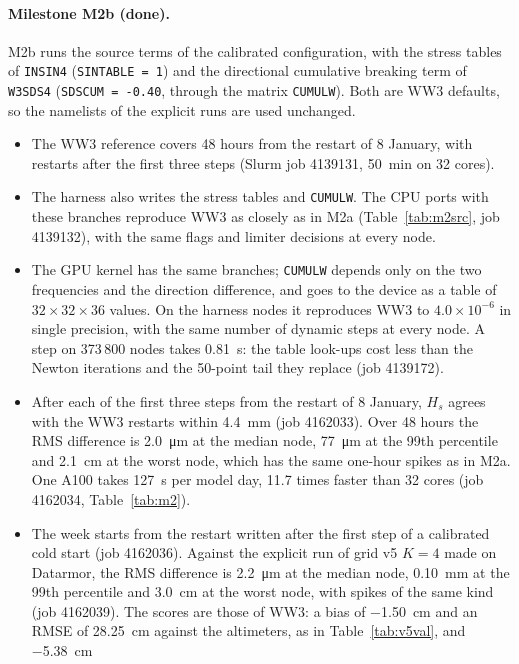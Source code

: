 \documentclass[11pt,a4paper]{article}
\begin{document}
\paragraph{Milestone M2b (done).} M2b runs the source terms of the
calibrated configuration, with the stress tables of \texttt{INSIN4}
(\texttt{SINTABLE = 1}) and the directional cumulative breaking term of
\texttt{W3SDS4} (\texttt{SDSCUM = -0.40}, through the matrix
\texttt{CUMULW}). Both are WW3 defaults, so the namelists of the explicit
runs are used unchanged.
\begin{itemize}
\item The WW3 reference covers 48 hours from the restart of 8 January,
with restarts after the first three steps (Slurm job 4139131, \SI{50}{min}
on 32 cores).
\item The harness also writes the stress tables and \texttt{CUMULW}. The
CPU ports with these branches reproduce WW3 as closely as in M2a
(Table~\ref{tab:m2src}, job 4139132), with the same flags and limiter
decisions at every node.
\item The GPU kernel has the same branches; \texttt{CUMULW} depends only on
the two frequencies and the direction difference, and goes to the device
as a table of $32\times32\times36$ values. On the harness nodes it
reproduces WW3 to $4.0\times10^{-6}$ in single precision, with the same
number of dynamic steps at every node. A step on 373\,800 nodes takes
\SI{0.81}{s}: the table look-ups cost less than the Newton iterations and
the 50-point tail they replace (job 4139172).
\item After each of the first three steps from the restart of 8 January,
$H_s$ agrees with the WW3 restarts within \SI{4.4}{mm} (job 4162033).
Over 48 hours the RMS difference is \SI{2.0}{\micro\metre} at the median
node, \SI{77}{\micro\metre} at the 99th percentile and \SI{2.1}{cm} at the
worst node, which has the same one-hour spikes as in M2a. One A100 takes
\SI{127}{s} per model day, 11.7 times faster than 32 cores (job 4162034,
Table~\ref{tab:m2}).
\item The week starts from the restart written after the first step of a
calibrated cold start (job 4162036). Against the explicit run of grid v5
$K=4$ made on Datarmor, the RMS difference is \SI{2.2}{\micro\metre} at
the median node, \SI{0.10}{mm} at the 99th percentile and \SI{3.0}{cm} at
the worst node, with spikes of the same kind (job 4162039). The scores are
those of WW3: a bias of \SI{-1.50}{cm} and an RMSE of \SI{28.25}{cm}
against the altimeters, as in Table~\ref{tab:v5val}, and \SI{-5.38}{cm}

\end{itemize}
\end{document}
